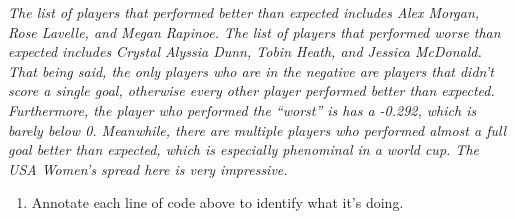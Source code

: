 \documentclass[]{article}
\newenvironment{Shaded}{\begin{snugshade}}{\end{snugshade}}
\newcommand{\CommentTok}[1]{\textcolor[rgb]{0.56,0.35,0.01}{\textit{#1}}}
\newcommand{\DataTypeTok}[1]{\textcolor[rgb]{0.13,0.29,0.53}{#1}}
\newcommand{\KeywordTok}[1]{\textcolor[rgb]{0.13,0.29,0.53}{\textbf{#1}}}
\newcommand{\NormalTok}[1]{#1}
\newcommand{\OperatorTok}[1]{\textcolor[rgb]{0.81,0.36,0.00}{\textbf{#1}}}
\newcommand{\StringTok}[1]{\textcolor[rgb]{0.31,0.60,0.02}{#1}}
\providecommand{\tightlist}{%
  \setlength{\itemsep}{0pt}\setlength{\parskip}{0pt}}
\begin{document}
\begin{Shaded}
\end{Shaded}

\emph{The list of players that performed better than expected includes
Alex Morgan, Rose Lavelle, and Megan Rapinoe. The list of players that
performed worse than expected includes Crystal Alyssia Dunn, Tobin
Heath, and Jessica McDonald. That being said, the only players who are
in the negative are players that didn't score a single goal, otherwise
every other player performed better than expected. Furthermore, the
player who performed the ``worst'' is has a -0.292, which is barely
below 0. Meanwhile, there are multiple players who performed almost a
full goal better than expected, which is especially phenominal in a
world cup. The USA Women's spread here is very impressive.}

\begin{enumerate}
\def\labelenumi{\arabic{enumi}.}
\setcounter{enumi}{6}
\tightlist
\item
  Annotate each line of code above to identify what it's doing.
\end{enumerate}

\begin{Shaded}
\end{Shaded}
\end{document}
